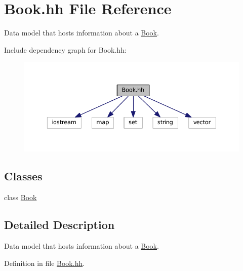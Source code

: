 \hypertarget{_book_8hh}{\section{Book.\+hh File Reference}
\label{_book_8hh}
}


Data model that hosts information about a \hyperlink{class_book}{Book}.  


Include dependency graph for Book.\+hh\+:
\nopagebreak
\begin{figure}[H]
\begin{center}
\leavevmode
\includegraphics[width=350pt]{_book_8hh__incl}
\end{center}
\end{figure}
\subsection*{Classes}
\begin{DoxyCompactItemize}
\item 
class \hyperlink{class_book}{Book}
\end{DoxyCompactItemize}


\subsection{Detailed Description}
Data model that hosts information about a \hyperlink{class_book}{Book}. 



Definition in file \hyperlink{_book_8hh_source}{Book.\+hh}.

